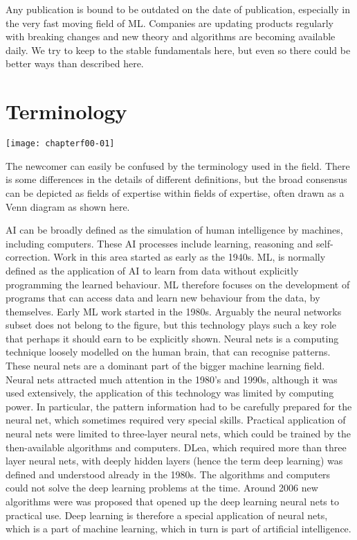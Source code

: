 Any publication is bound to be outdated on the date of publication, especially in the very fast moving field of \ac{ML}. Companies are updating products regularly with breaking changes and new theory and algorithms are becoming available daily. We try to keep to the stable fundamentals here, but even so there could be better ways than described here.

\section*{Terminology}

\begin{marginfigure}
\texttt{[image: chapterf00-01]}
\end{marginfigure}

The newcomer can easily be confused by the terminology used in the field.  There is some differences in the details of different definitions, but the broad consensus can be depicted as fields of expertise within fields of expertise, often drawn as a Venn diagram as shown here.

\ac{AI} can be broadly defined as the simulation of human intelligence by machines, including computers. These \ac{AI} processes include learning, reasoning and self-correction. Work in this area started as early as the 1940s. \ac{ML}\cite{WikiPediaMachineLearning2019,DanielFaggella2019}, is normally defined as the application of \ac{AI} to learn from data without explicitly programming the learned behaviour. \ac{ML} therefore focuses on the development of programs that can access data and learn new behaviour from the data, by themselves.  Early ML work started in the 1980s. Arguably the neural networks subset does not belong to the figure, but this technology plays such a key role that perhaps it should earn to be explicitly shown.  Neural nets is a computing technique loosely modelled on the human brain, that can  recognise patterns.  These neural nets are a dominant part of the bigger machine learning field. Neural nets attracted much attention in the 1980's and 1990s, although it was used extensively, the application of this technology was limited by computing power.  In particular, the pattern information had to be carefully prepared for the neural net, which sometimes required very special skills. Practical application of neural nets were limited to three-layer neural nets, which could be trained by the then-available algorithms and computers.  \ac{DLea}\cite{WikiPediaDeepLearning2019}, which required more than three layer neural nets, with deeply hidden layers (hence the term deep learning) was defined and understood already in the 1980s.  The algorithms and computers could not solve the deep learning problems at the time.   Around 2006 new algorithms were was proposed that opened up the deep learning neural nets to practical use.
Deep learning is therefore a special application of neural nets, which is a part of machine learning, which in turn is part of artificial intelligence.

